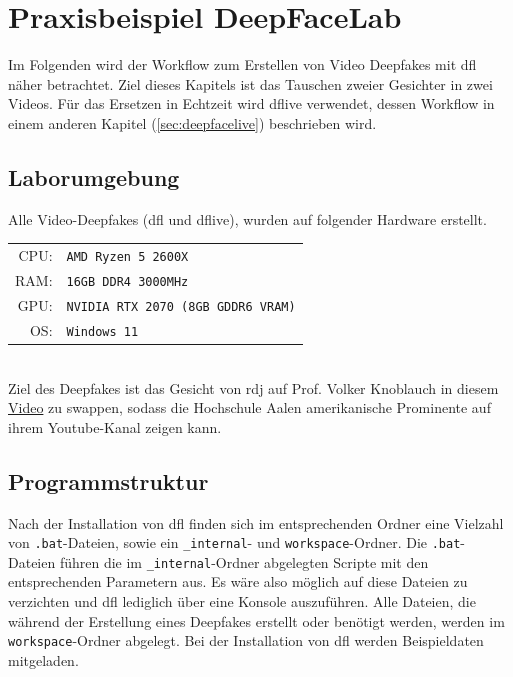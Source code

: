 \section{Praxisbeispiel DeepFaceLab}\label{sec:praxisbeispiel-dfl}
Im Folgenden wird der Workflow zum Erstellen von Video Deepfakes mit \gls{dfl} näher betrachtet.
Ziel dieses Kapitels ist das Tauschen zweier Gesichter in zwei Videos.
Für das Ersetzen in Echtzeit wird \gls{dflive} verwendet, dessen Workflow in einem anderen Kapitel (\ref{sec:deepfacelive}) beschrieben wird.

\subsection{Laborumgebung}\label{subsec:laborumgebung}
Alle Video-Deepfakes (\gls{dfl} und \gls{dflive}), wurden auf folgender Hardware erstellt.\\[0.5cm]
\begin{tabular}{rl}
    CPU:& \texttt{AMD Ryzen 5 2600X}\\
    RAM:& \texttt{16GB DDR4 3000MHz}\\
    GPU:& \texttt{NVIDIA RTX 2070 (8GB GDDR6 VRAM)}\\
    OS:& \texttt{Windows 11}
\end{tabular}\\[0.5cm]

Ziel des Deepfakes ist das Gesicht von \gls{rdj} auf Prof. Volker Knoblauch in diesem \href{https://www.youtube.com/watch?v=rksMPlRSbQU}{Video} zu swappen,
sodass die Hochschule Aalen amerikanische Prominente auf ihrem Youtube-Kanal zeigen kann.

\subsection{Programmstruktur}\label{subsec:programmstruktur}
Nach der Installation von \gls{dfl} finden sich im entsprechenden Ordner eine Vielzahl von \texttt{.bat}-Dateien, sowie ein \texttt{\_internal}- und \texttt{workspace}-Ordner.
Die \texttt{.bat}-Dateien führen die im \texttt{\_internal}-Ordner abgelegten Scripte mit den entsprechenden Parametern aus.
Es wäre also möglich auf diese Dateien zu verzichten und \gls{dfl} lediglich über eine Konsole auszuführen.
Alle Dateien, die während der Erstellung eines Deepfakes erstellt oder benötigt werden, werden im \texttt{workspace}-Ordner abgelegt.
Bei der Installation von \gls{dfl} werden Beispieldaten mitgeladen.\\

